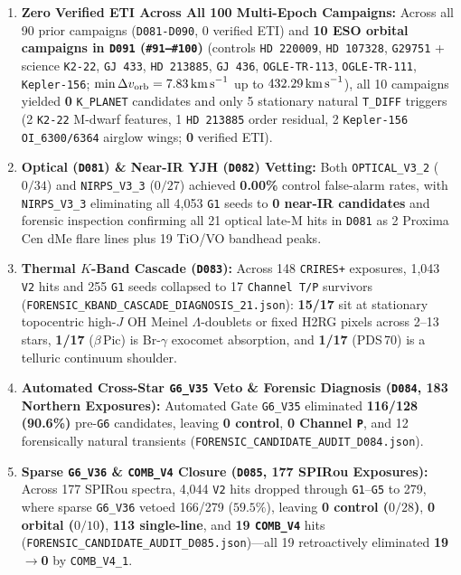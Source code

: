 \documentclass[twocolumn,10pt]{article}
\begin{document}
\begin{enumerate}
  \item \textbf{Zero Verified ETI Across All 100 Multi-Epoch Campaigns:} Across all 90 prior campaigns (\texttt{D081-D090}, 0 verified ETI) and \textbf{10 ESO orbital campaigns in \texttt{D091} (\texttt{\#91--\#100})} (controls \texttt{HD\,220009}, \texttt{HD\,107328}, \texttt{G29751} + science \texttt{K2-22}, \texttt{GJ\,433}, \texttt{HD\,213885}, \texttt{GJ\,436}, \texttt{OGLE-TR-113}, \texttt{OGLE-TR-111}, \texttt{Kepler-156}; $\min\Delta v_{\mathrm{orb}} = 7.83\,\text{km\,s}^{-1}$ up to $432.29\,\text{km\,s}^{-1}$), all 10 campaigns yielded \textbf{0} \texttt{K\_PLANET} candidates and only 5 stationary natural \texttt{T\_DIFF} triggers (2 \texttt{K2-22} M-dwarf features, 1 \texttt{HD\,213885} order residual, 2 \texttt{Kepler-156} \texttt{OI\_6300/6364} airglow wings; \textbf{0} verified ETI).
  \item \textbf{Optical (\texttt{D081}) \& Near-IR YJH (\texttt{D082}) Vetting:} Both \texttt{OPTICAL\_V3\_2} ($0/34$) and \texttt{NIRPS\_V3\_3} ($0/27$) achieved \textbf{0.00\%} control false-alarm rates, with \texttt{NIRPS\_V3\_3} eliminating all 4,053 \texttt{G1} seeds to \textbf{0 near-IR candidates} and forensic inspection confirming all 21 optical late-M hits in \texttt{D081} as 2 Proxima Cen dMe flare lines \cite{Fuhrmeister2011} plus 19 TiO/VO bandhead peaks.
  \item \textbf{Thermal $K$-Band Cascade (\texttt{D083}):} Across 148 \texttt{CRIRES+} exposures, 1,043 \texttt{V2} hits and 255 \texttt{G1} seeds collapsed to 17 \texttt{Channel T/P} survivors (\texttt{FORENSIC\_KBAND\_CASCADE\_DIAGNOSIS\_21.json}): \textbf{15/17} sit at stationary topocentric high-$J$ OH Meinel $\Lambda$-doublets \cite{Oliva2015} or fixed H2RG pixels across 2--13 stars, \textbf{1/17} ($\beta$\,Pic) is Br-$\gamma$ exocomet absorption, and \textbf{1/17} (PDS\,70) is a telluric continuum shoulder.
  \item \textbf{Automated Cross-Star \texttt{G6\_V35} Veto \& Forensic Diagnosis (\texttt{D084}, 183 Northern Exposures):} Automated Gate \texttt{G6\_V35} eliminated \textbf{116/128 (90.6\%)} pre-\texttt{G6} candidates, leaving \textbf{0 control}, \textbf{0 Channel \texttt{P}}, and 12 forensically natural transients (\texttt{FORENSIC\_CANDIDATE\_AUDIT\_D084.json}).
  \item \textbf{Sparse \texttt{G6\_V36} \& \texttt{COMB\_V4} Closure (\texttt{D085}, 177 SPIRou Exposures):} Across 177 SPIRou spectra, 4,044 \texttt{V2} hits dropped through \texttt{G1}--\texttt{G5} to 279, where sparse \texttt{G6\_V36} vetoed 166/279 ($59.5\%$), leaving \textbf{0 control ($0/28$)}, \textbf{0 orbital ($0/10$)}, \textbf{113 single-line}, and \textbf{19 \texttt{COMB\_V4}} hits (\texttt{FORENSIC\_CANDIDATE\_AUDIT\_D085.json})---all 19 retroactively eliminated \textbf{19$\rightarrow$0} by \texttt{COMB\_V4\_1}.

\end{enumerate}
\end{document}
